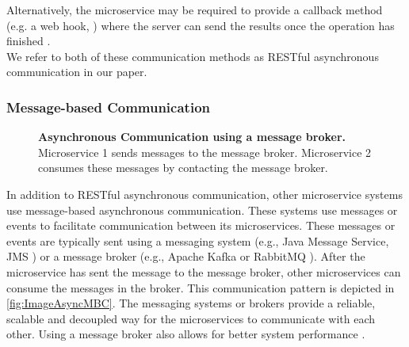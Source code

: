 Alternatively, the microservice may be required to provide a callback method (e.g. a web hook, \cite{Webhooks}) where the server can send the results once the operation has finished \cite{Mayer2018}. \\

We refer to both of these communication methods as RESTful asynchronous communication in our paper.


\subsubsection{Message-based Communication}
\label{sec:Foundation:AsyncCommunication:MBC}

\begin{figure}
\centering
{}
\caption{\textbf{Asynchronous Communication using a message broker.} \\
Microservice 1 sends messages to the message broker. Microservice 2 consumes these messages by contacting the message broker.}
\label{fig:ImageAsyncMBC}
\end{figure}

In addition to RESTful asynchronous communication, other microservice systems use message-based asynchronous communication.
These systems use messages or events to facilitate communication between its microservices.
These messages or events are typically sent using a messaging system (e.g., Java Message Service, JMS \cite{JMS}) or a message broker (e.g., Apache Kafka \cite{ApacheKafka} or RabbitMQ \cite{RabbitMQ}).
After the microservice has sent the message to the message broker, other microservices can consume the messages in the broker.
This communication pattern is depicted in \autoref{fig:ImageAsyncMBC}.
The messaging systems or brokers provide a reliable, scalable and decoupled way for the microservices to communicate with each other.
Using a message broker also allows for better system performance \cite{Singh2021}.


